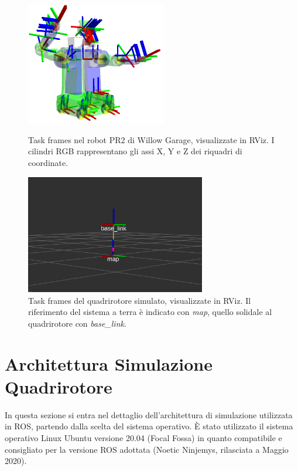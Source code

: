 \begin{figure}[H]
	\begin{center}
	
	\includegraphics[width=0.55\textwidth]{gfx/tfROS}
    \caption[Task frames nel robot PR2 di Willow Garage.]{Task frames nel robot PR2 di Willow Garage, visualizzate in \acs{RViz}. I cilindri RGB rappresentano gli assi X, Y e Z dei riquadri di coordinate.}
    \label{fig:tf_ROS}
    
    \vspace{30mm}

	\includegraphics[width=0.7\textwidth]{gfx/ROS/rqt_rviz}
	\caption[Task frames del quadrirotore simulato, in \acs{RViz}.]{Task frames del quadrirotore simulato, visualizzate in \acs{RViz}. Il riferimento del sistema a terra è indicato con \emph{map}, quello solidale al quadrirotore con \emph{base\_link}.}
	\label{fig:droneRviz}
		
	\end{center}
\end{figure}


\section{Architettura Simulazione Quadrirotore}
In questa sezione si entra nel dettaglio dell'architettura di simulazione utilizzata in \acs{ROS}, partendo dalla scelta del sistema operativo. È stato utilizzato il sistema operativo Linux Ubuntu versione 20.04 (Focal Fossa) in quanto compatibile e consigliato per la versione \acs{ROS} adottata (Noetic Ninjemys, rilasciata a Maggio 2020).

